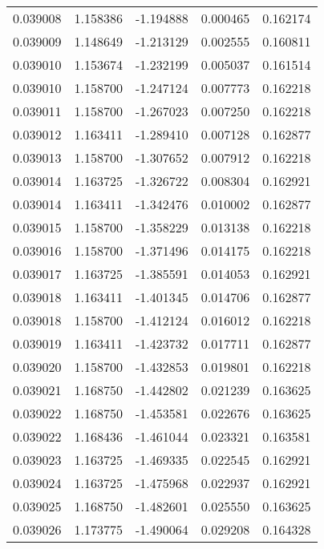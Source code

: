 \begin{tabular}{lrrrr}
0.039008    &  1.158386 & -1.194888 &  0.000465 &             0.162174 \\
0.039009    &  1.148649 & -1.213129 &  0.002555 &             0.160811 \\
0.039010    &  1.153674 & -1.232199 &  0.005037 &             0.161514 \\
0.039010    &  1.158700 & -1.247124 &  0.007773 &             0.162218 \\
0.039011    &  1.158700 & -1.267023 &  0.007250 &             0.162218 \\
0.039012    &  1.163411 & -1.289410 &  0.007128 &             0.162877 \\
0.039013    &  1.158700 & -1.307652 &  0.007912 &             0.162218 \\
0.039014    &  1.163725 & -1.326722 &  0.008304 &             0.162921 \\
0.039014    &  1.163411 & -1.342476 &  0.010002 &             0.162877 \\
0.039015    &  1.158700 & -1.358229 &  0.013138 &             0.162218 \\
0.039016    &  1.158700 & -1.371496 &  0.014175 &             0.162218 \\
0.039017    &  1.163725 & -1.385591 &  0.014053 &             0.162921 \\
0.039018    &  1.163411 & -1.401345 &  0.014706 &             0.162877 \\
0.039018    &  1.158700 & -1.412124 &  0.016012 &             0.162218 \\
0.039019    &  1.163411 & -1.423732 &  0.017711 &             0.162877 \\
0.039020    &  1.158700 & -1.432853 &  0.019801 &             0.162218 \\
0.039021    &  1.168750 & -1.442802 &  0.021239 &             0.163625 \\
0.039022    &  1.168750 & -1.453581 &  0.022676 &             0.163625 \\
0.039022    &  1.168436 & -1.461044 &  0.023321 &             0.163581 \\
0.039023    &  1.163725 & -1.469335 &  0.022545 &             0.162921 \\
0.039024    &  1.163725 & -1.475968 &  0.022937 &             0.162921 \\
0.039025    &  1.168750 & -1.482601 &  0.025550 &             0.163625 \\
0.039026    &  1.173775 & -1.490064 &  0.029208 &             0.164328 \\

\end{tabular}
